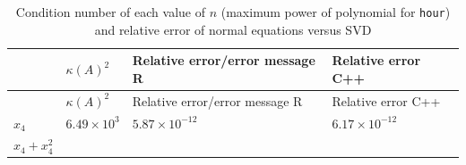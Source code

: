 \documentclass[
]{article}
\begin{document}
\begin{longtable}[]{@{}llll@{}}
\caption{Condition number of each value of \(n\) (maximum power of
polynomial for \texttt{hour}) and relative error of normal equations
versus SVD}\tabularnewline
\toprule
\begin{minipage}[b]{0.23\columnwidth}\raggedright
\strut
\end{minipage} & \begin{minipage}[b]{0.15\columnwidth}\raggedright
\(\kappa(A)^{2}\)\strut
\end{minipage} & \begin{minipage}[b]{0.36\columnwidth}\raggedright
Relative error/error message R\strut
\end{minipage} & \begin{minipage}[b]{0.15\columnwidth}\raggedright
Relative error C++\strut
\end{minipage}\tabularnewline
\midrule
\endfirsthead
\toprule
\begin{minipage}[b]{0.23\columnwidth}\raggedright
\strut
\end{minipage} & \begin{minipage}[b]{0.15\columnwidth}\raggedright
\(\kappa(A)^{2}\)\strut
\end{minipage} & \begin{minipage}[b]{0.36\columnwidth}\raggedright
Relative error/error message R\strut
\end{minipage} & \begin{minipage}[b]{0.15\columnwidth}\raggedright
Relative error C++\strut
\end{minipage}\tabularnewline
\midrule
\endhead
\begin{minipage}[t]{0.23\columnwidth}\raggedright
\(x_{4}\)\strut
\end{minipage} & \begin{minipage}[t]{0.15\columnwidth}\raggedright
\(6.49 \times 10^{3}\)\strut
\end{minipage} & \begin{minipage}[t]{0.36\columnwidth}\raggedright
\(5.87 \times 10^{-12}\)\strut
\end{minipage} & \begin{minipage}[t]{0.15\columnwidth}\raggedright
\(6.17 \times 10^{-12}\)\strut
\end{minipage}\tabularnewline
\begin{minipage}[t]{0.23\columnwidth}\raggedright
\(x_{4}+x_{4}^{2}\)\strut
\end{minipage} & \begin{minipage}[t]{0.15\columnwidth}\raggedright

\end{minipage}
\end{longtable}
\end{document}
